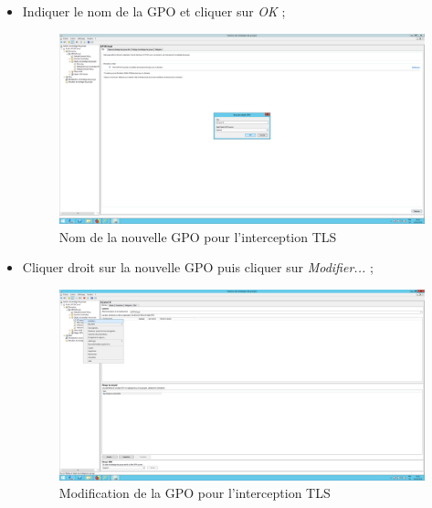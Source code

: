 \begin{itemize}
\item Indiquer le nom de la GPO et cliquer sur \textit{OK} ;
\begin{figure}[h!]
    \begin{center}
        \includegraphics[scale=0.20]{Interception_Screenshots/GPO2.png}
        \caption{Nom de la nouvelle GPO pour l'interception TLS}
    \end{center}
\end{figure}
\FloatBarrier 

\item Cliquer droit sur la nouvelle GPO puis cliquer sur \textit{Modifier...} ;
\begin{figure}[h!]
    \begin{center}
        \includegraphics[scale=0.20]{Interception_Screenshots/GPO3.png}
        \caption{Modification de la GPO pour l'interception TLS}
    \end{center}
\end{figure}
\FloatBarrier 


\end{itemize}
